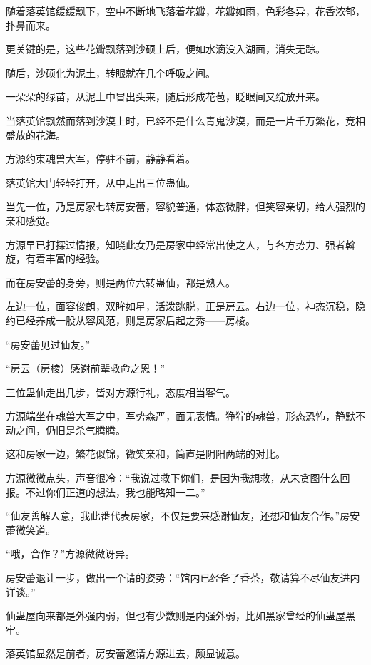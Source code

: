 
\begin{this_body}



随着落英馆缓缓飘下，空中不断地飞落着花瓣，花瓣如雨，色彩各异，花香浓郁，扑鼻而来。

更关键的是，这些花瓣飘落到沙硕上后，便如水滴没入湖面，消失无踪。

随后，沙硕化为泥土，转眼就在几个呼吸之间。

一朵朵的绿苗，从泥土中冒出头来，随后形成花苞，眨眼间又绽放开来。

当落英馆飘然而落到沙漠上时，已经不是什么青鬼沙漠，而是一片千万繁花，竞相盛放的花海。

方源约束魂兽大军，停驻不前，静静看着。

落英馆大门轻轻打开，从中走出三位蛊仙。

当先一位，乃是房家七转房安蕾，容貌普通，体态微胖，但笑容亲切，给人强烈的亲和感觉。

方源早已打探过情报，知晓此女乃是房家中经常出使之人，与各方势力、强者斡旋，有着丰富的经验。

而在房安蕾的身旁，则是两位六转蛊仙，都是熟人。

左边一位，面容俊朗，双眸如星，活泼跳脱，正是房云。右边一位，神态沉稳，隐约已经养成一股从容风范，则是房家后起之秀——房棱。

“房安蕾见过仙友。”

“房云（房棱）感谢前辈救命之恩！”

三位蛊仙走出几步，皆对方源行礼，态度相当客气。

方源端坐在魂兽大军之中，军势森严，面无表情。狰狞的魂兽，形态恐怖，静默不动之间，仍旧是杀气腾腾。

这和房家一边，繁花似锦，微笑亲和，简直是阴阳两端的对比。

方源微微点头，声音很冷：“我说过救下你们，是因为我想救，从未贪图什么回报。不过你们正道的想法，我也能略知一二。”

“仙友善解人意，我此番代表房家，不仅是要来感谢仙友，还想和仙友合作。”房安蕾微笑道。

“哦，合作？”方源微微讶异。

房安蕾退让一步，做出一个请的姿势：“馆内已经备了香茶，敬请算不尽仙友进内详谈。”

仙蛊屋向来都是外强内弱，但也有少数则是内强外弱，比如黑家曾经的仙蛊屋黑牢。

落英馆显然是前者，房安蕾邀请方源进去，颇显诚意。


\end{this_body}
